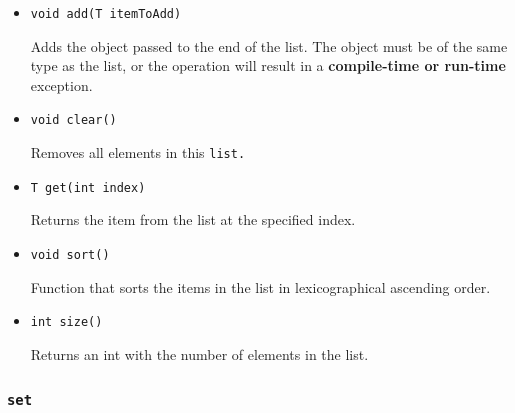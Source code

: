 \documentclass{book}
\begin{document}
\begin{itemize}

\item[] \tt void add(T itemToAdd) \rm

Adds the object passed to the end of the list. The object must be of the same
type as the list, or the operation will result in a \textbf{compile-time or
run-time} exception.

\item[] \tt void clear() \rm

Removes all elements in this \tt list\rm.

\item[] \tt T get(int index) \rm

Returns the item from the list at the specified index.


\item[] \tt void sort() \rm

Function that sorts the items in the list in lexicographical ascending order.

\item[] \tt int size() \rm

Returns an int with the number of elements in the list.

\end{itemize}



\subsubsection{\tt set \rm} %
\label{ssub:tt_set_rm}
\end{document}
